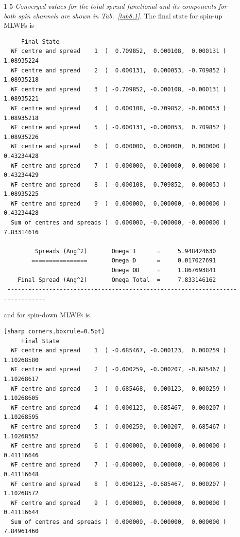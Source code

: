 \begin{enumerate}
	\item[1-5] {\it Converged values for the total spread functional and its components for both spin channels are shown in Tab.~\ref{tab8.1}.} 
	The final state for spin-up MLWFs is
	\begin{tcolorbox}[sharp corners,boxrule=0.5pt]
	{\small
	\begin{verbatim}
	 Final State
  WF centre and spread    1  (  0.709852,  0.000108,  0.000131 )     1.08935224
  WF centre and spread    2  (  0.000131,  0.000053, -0.709852 )     1.08935218
  WF centre and spread    3  ( -0.709852, -0.000108, -0.000131 )     1.08935221
  WF centre and spread    4  (  0.000108, -0.709852, -0.000053 )     1.08935218
  WF centre and spread    5  ( -0.000131, -0.000053,  0.709852 )     1.08935226
  WF centre and spread    6  (  0.000000,  0.000000,  0.000000 )     0.43234428
  WF centre and spread    7  ( -0.000000,  0.000000,  0.000000 )     0.43234429
  WF centre and spread    8  ( -0.000108,  0.709852,  0.000053 )     1.08935225
  WF centre and spread    9  (  0.000000,  0.000000, -0.000000 )     0.43234428
  Sum of centres and spreads (  0.000000, -0.000000, -0.000000 )     7.83314616
 
         Spreads (Ang^2)       Omega I      =     5.948424630
        ================       Omega D      =     0.017027691
                               Omega OD     =     1.867693841
    Final Spread (Ang^2)       Omega Total  =     7.833146162
 ------------------------------------------------------------------------------
	\end{verbatim}
	}
	\end{tcolorbox}
	and for spin-down MLWFs is
	  \begin{tcolorbox}
  {\small
	\begin{verbatim}[sharp corners,boxrule=0.5pt]
	 Final State
  WF centre and spread    1  ( -0.685467, -0.000123,  0.000259 )     1.10268580
  WF centre and spread    2  ( -0.000259, -0.000207, -0.685467 )     1.10268617
  WF centre and spread    3  (  0.685468,  0.000123, -0.000259 )     1.10268605
  WF centre and spread    4  ( -0.000123,  0.685467, -0.000207 )     1.10268595
  WF centre and spread    5  (  0.000259,  0.000207,  0.685467 )     1.10268552
  WF centre and spread    6  (  0.000000,  0.000000, -0.000000 )     0.41116646
  WF centre and spread    7  ( -0.000000,  0.000000, -0.000000 )     0.41116648
  WF centre and spread    8  (  0.000123, -0.685467,  0.000207 )     1.10268572
  WF centre and spread    9  (  0.000000,  0.000000,  0.000000 )     0.41116644
  Sum of centres and spreads (  0.000000, -0.000000,  0.000000 )     7.84961460
 

\end{verbatim}}
\end{tcolorbox}
\end{enumerate}
